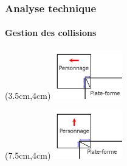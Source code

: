 \begin{frame}

	\frametitle{Analyse technique}
	\framesubtitle{Gestion des collisions}

	\begin{textblock*}{3cm}(3.5cm,4cm)
		\includegraphics[width=3cm]{figures/collision_decalGauche.jpg}
	\end{textblock*}

	\begin{textblock*}{3cm}(7.5cm,4cm)
		\includegraphics[width=3cm]{figures/collision_decalHaut.jpg}
	\end{textblock*}

\end{frame}
